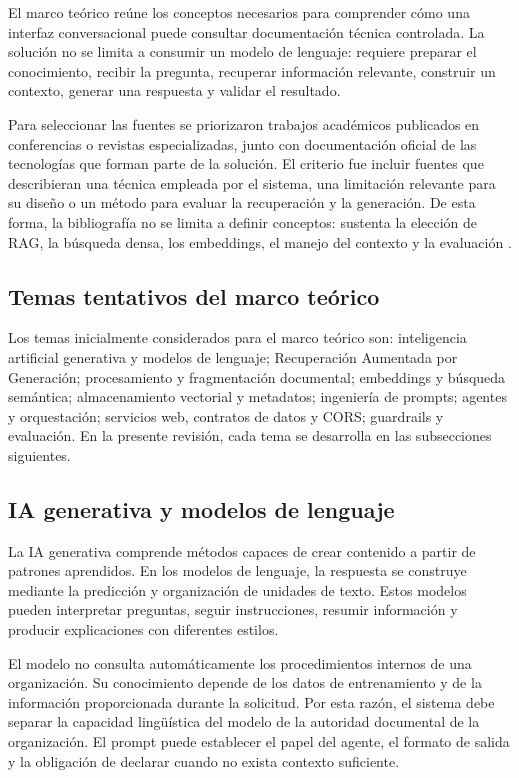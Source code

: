 El marco teórico reúne los conceptos necesarios para comprender cómo una interfaz conversacional puede consultar documentación técnica controlada. La solución no se limita a consumir un modelo de lenguaje: requiere preparar el conocimiento, recibir la pregunta, recuperar información relevante, construir un contexto, generar una respuesta y validar el resultado.

Para seleccionar las fuentes se priorizaron trabajos académicos publicados en conferencias o revistas especializadas, junto con documentación oficial de las tecnologías que forman parte de la solución. El criterio fue incluir fuentes que describieran una técnica empleada por el sistema, una limitación relevante para su diseño o un método para evaluar la recuperación y la generación. De esta forma, la bibliografía no se limita a definir conceptos: sustenta la elección de RAG, la búsqueda densa, los embeddings, el manejo del contexto y la evaluación \cite{lewis2020rag,gao2023rag,karpukhin2020dpr,reimers2019sbert,malkov2018hnsw,johnson2017faiss,liu2024lostmiddle,asai2024selfrag,es2024ragas}.

\subsection{Temas tentativos del marco teórico} %

Los temas inicialmente considerados para el marco teórico son: inteligencia artificial generativa y modelos de lenguaje; Recuperación Aumentada por Generación; procesamiento y fragmentación documental; embeddings y búsqueda semántica; almacenamiento vectorial y metadatos; ingeniería de prompts; agentes y orquestación; servicios web, contratos de datos y CORS; guardrails y evaluación. En la presente revisión, cada tema se desarrolla en las subsecciones siguientes.

\subsection{IA generativa y modelos de lenguaje}

La IA generativa comprende métodos capaces de crear contenido a partir de patrones aprendidos. En los modelos de lenguaje, la respuesta se construye mediante la predicción y organización de unidades de texto. Estos modelos pueden interpretar preguntas, seguir instrucciones, resumir información y producir explicaciones con diferentes estilos.

El modelo no consulta automáticamente los procedimientos internos de una organización. Su conocimiento depende de los datos de entrenamiento y de la información proporcionada durante la solicitud. Por esta razón, el sistema debe separar la capacidad lingüística del modelo de la autoridad documental de la organización. El prompt puede establecer el papel del agente, el formato de salida y la obligación de declarar cuando no exista contexto suficiente.

